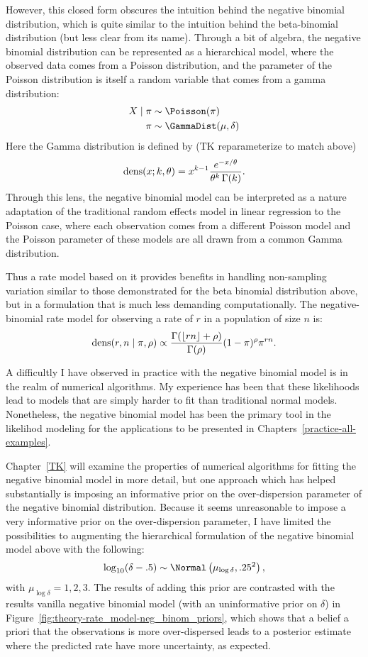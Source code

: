 However, this closed form obscures the intuition behind the negative
binomial distribution, which is quite similar to the intuition behind
the beta-binomial distribution (but less clear from its
name). Through a bit of algebra, the negative binomial distribution can
be represented as a hierarchical model, where the observed data comes
from a Poisson distribution, and the parameter of the Poisson
distribution is itself a random variable that comes from a gamma
distribution:
\begin{align*}
X\given \pi &\sim \Poisson(\pi)\\
\pi &\sim \GammaDist(\mu, \delta)
\end{align*}
Here the Gamma distribution is defined by (TK reparameterize to match above)
\[
\operatorname{dens}(x; k,\theta) =
x^{k-1} \frac{e^{-x/\theta}}{\theta^k \, \Gamma(k)}.
\]
Through this lens, the negative binomial model can be interpreted as a
nature adaptation of the traditional random effects model in linear
regression to the Poisson case, where each observation comes from a
different Poisson model and the Poisson parameter of these models are
all drawn from a common Gamma distribution.

Thus a rate model based on it provides benefits in handling
non-sampling variation similar to those demonstrated for the beta
binomial distribution above, but in a formulation that is much less
demanding computationally.  The negative-binomial rate model for
observing a rate of $r$ in a population of size $n$ is:
\[
\operatorname{dens}(r,n\;|\; \pi, \rho) \propto \frac{\Gamma(\lfloor rn\rfloor+\rho)}{\Gamma(\rho)} (1-\pi)^\rho \pi^{rn}.
\]

A difficultly I have observed in practice with the negative binomial
model is in the realm of numerical algorithms.  My experience has been that these
likelihoods lead to models that are simply harder to fit than
traditional normal models.  Nonetheless, the negative binomial model
has been the primary tool in the likelihod modeling for the
applications to be presented in Chapters~\ref{practice-all-examples}.

Chapter~\ref{TK} will examine the properties of numerical algorithms
for fitting the negative binomial model in more detail, but one
approach which has helped substantially is imposing an informative
prior on the over-dispersion parameter of the negative binomial
distribution.  Because it seems unreasonable to impose a very
informative prior on the over-dispersion parameter, I have limited the
possibilities to augmenting the hierarchical formulation of the
negative binomial model above with the following:
\[
\log_{10} (\delta-.5) \sim \Normal\left(\mu_{\log\delta}, .25^2\right),
\]
with $\mu_{\log\delta} = 1, 2, 3$.  The results of adding this
prior are contrasted with the results vanilla negative binomial model
(with an uninformative prior on $\delta$) in
Figure~\ref{fig:theory-rate_model-neg_binom_priors}, which shows that
a belief a priori that the observations is more over-dispersed leads
to a posterior estimate where the predicted rate have more
uncertainty, as expected.

